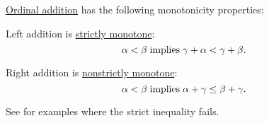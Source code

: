 \begin{proposition}\label{thm:ordinal_addition_is_monotone}
  \hyperref[def:ordinal_arithmetic/addition]{Ordinal addition} has the following monotonicity properties:
  \begin{thmenum}
     Left addition is \hyperref[eq:def:partially_ordered_set/homomorphism/strict]{strictly monotone}:
    \begin{equation}\label{eq:thm:ordinal_addition_is_monotone/left}
      \alpha < \beta \T{implies} \gamma + \alpha < \gamma + \beta.
    \end{equation}

     Right addition is \hyperref[eq:def:partially_ordered_set/homomorphism/nonstrict]{nonstrictly monotone}:
    \begin{equation}\label{eq:thm:ordinal_addition_is_monotone/right}
      \alpha < \beta \T{implies} \alpha + \gamma \leq \beta + \gamma.
    \end{equation}

    See  for examples where the strict inequality fails.
  \end{thmenum}
\end{proposition}
